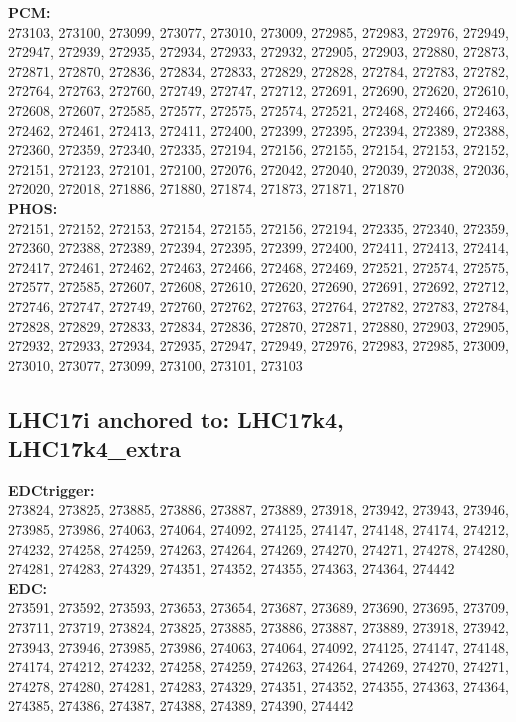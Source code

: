  \textbf{PCM:}\\
273103, 273100, 273099, 273077, 273010, 273009, 272985, 272983, 272976, 272949, 272947, 272939, 272935, 272934, 272933, 272932, 272905, 272903, 272880, 272873, 272871, 272870, 272836, 272834, 272833, 272829, 272828, 272784, 272783, 272782, 272764, 272763, 272760, 272749, 272747, 272712, 272691, 272690, 272620, 272610, 272608, 272607, 272585, 272577, 272575, 272574, 272521, 272468, 272466, 272463, 272462, 272461, 272413, 272411, 272400, 272399, 272395, 272394, 272389, 272388, 272360, 272359, 272340, 272335, 272194, 272156, 272155, 272154, 272153, 272152, 272151, 272123, 272101, 272100, 272076, 272042, 272040, 272039, 272038, 272036, 272020, 272018, 271886, 271880, 271874, 271873, 271871, 271870\\

 \textbf{PHOS:}\\
272151, 272152, 272153, 272154, 272155, 272156, 272194, 272335, 272340, 272359, 272360, 272388, 272389, 272394, 272395, 272399, 272400, 272411, 272413, 272414, 272417, 272461, 272462, 272463, 272466, 272468, 272469, 272521, 272574, 272575, 272577, 272585, 272607, 272608, 272610, 272620, 272690, 272691, 272692, 272712, 272746, 272747, 272749, 272760, 272762, 272763, 272764, 272782, 272783, 272784, 272828, 272829, 272833, 272834, 272836, 272870, 272871, 272880, 272903, 272905, 272932, 272933, 272934, 272935, 272947, 272949, 272976, 272983, 272985, 273009, 273010, 273077, 273099, 273100, 273101, 273103\\

 \subsection{LHC17i anchored to: LHC17k4, LHC17k4\_extra}

 \textbf{EDCtrigger:}\\
273824, 273825, 273885, 273886, 273887, 273889, 273918, 273942, 273943, 273946, 273985, 273986, 274063, 274064, 274092, 274125, 274147, 274148, 274174, 274212, 274232, 274258, 274259, 274263, 274264, 274269, 274270, 274271, 274278, 274280, 274281, 274283, 274329, 274351, 274352, 274355, 274363, 274364, 274442\\

 \textbf{EDC:}\\
273591, 273592, 273593, 273653, 273654, 273687, 273689, 273690, 273695, 273709, 273711, 273719, 273824, 273825, 273885, 273886, 273887, 273889, 273918, 273942, 273943, 273946, 273985, 273986, 274063, 274064, 274092, 274125, 274147, 274148, 274174, 274212, 274232, 274258, 274259, 274263, 274264, 274269, 274270, 274271, 274278, 274280, 274281, 274283, 274329, 274351, 274352, 274355, 274363, 274364, 274385, 274386, 274387, 274388, 274389, 274390, 274442\\


